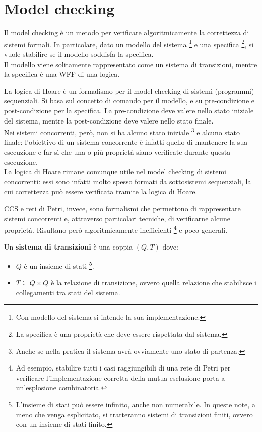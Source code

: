 \chapter{Model checking}
Il model checking è un metodo per verificare algoritmicamente la correttezza di sistemi formali. In particolare, dato un modello del sistema \footnote{Con modello del sistema si intende la sua implementazione.} e una specifica \footnote{La specifica è una proprietà che deve essere rispettata dal sistema.}, si vuole stabilire se il modello soddisfa la specifica.\\
Il modello viene solitamente rappresentato come un sistema di transizioni, mentre la specifica è una WFF di una logica.

La logica di Hoare è un formalismo per il model checking di sistemi (programmi) sequenziali. Si basa sul concetto di comando per il modello, e su pre-condizione e post-condizione per la specifica. La pre-condizione deve valere nello stato iniziale del sistema, mentre la post-condizione deve valere nello stato finale.\\
Nei sistemi concorrenti, però, non si ha alcuno stato iniziale \footnote{Anche se nella pratica il sistema avrà ovviamente uno stato di partenza.} e alcuno stato finale: l'obiettivo di un sistema concorrente è infatti quello di mantenere la sua esecuzione e far sì che una o più proprietà siano verificate durante questa esecuzione.\\
La logica di Hoare rimane comunque utile nel model checking di sistemi concorrenti: essi sono infatti molto spesso formati da sottosistemi sequenziali, la cui correttezza può essere verificata tramite la logica di Hoare.

CCS e reti di Petri, invece, sono formalismi che permettono di rappresentare sistemi concorrenti e, attraverso particolari tecniche, di verificarne alcune proprietà. Risultano però algoritmicamente inefficienti \footnote{Ad esempio, stabilire tutti i casi raggiungibili di una rete di Petri per verificare l'implementazione corretta della mutua esclusione porta a un'esplosione combinatoria.} e poco generali.

\begin{defn}
    Un \textbf{sistema di transizioni} è una coppia $(Q, T)$ dove:
    \begin{itemize}
        \item $Q$ è un insieme di stati \footnote[][1cm]{L'insieme di stati può essere infinito, anche non numerabile. In queste note, a meno che venga esplicitato, si tratteranno sistemi di transizioni finiti, ovvero con un insieme di stati finito.}.
        \item $T \subseteq Q \times Q$ è la relazione di transizione, ovvero quella relazione che stabilisce i collegamenti tra stati del sistema.
    \end{itemize}
\end{defn}

